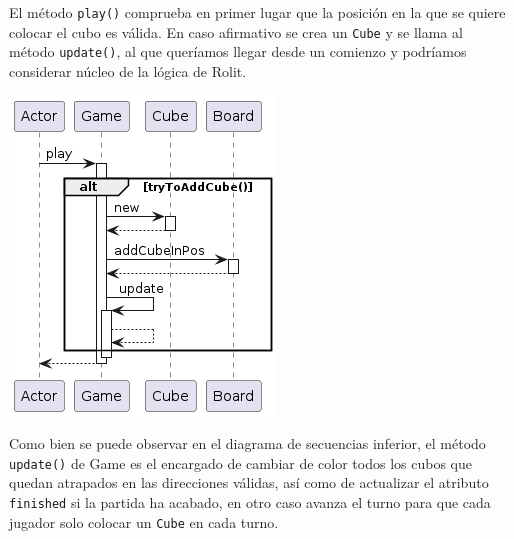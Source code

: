 \documentclass[../DocumentoOficial.tex]{subfiles}
\begin{document}
\begin{sprint}[1]
El método \texttt{play()} comprueba en primer lugar que la posición en la que se quiere colocar el cubo es válida. En caso afirmativo se crea un \texttt{Cube} y se llama al método \texttt{update()}, al que queríamos llegar desde un comienzo y podríamos considerar núcleo de la lógica de Rolit.
\begin{center}
\includegraphics[scale=0.55]{play-game.png}
\end{center}
Como bien se puede observar en el diagrama de secuencias inferior, el método
\texttt{update()} de Game  es el encargado de cambiar de color todos los cubos que quedan atrapados en las direcciones válidas, así como de actualizar el atributo \texttt{finished} si la partida ha acabado, en otro caso avanza el turno para que cada jugador solo colocar un \texttt{Cube} en cada turno.
\begin{center}

\end{center}
\end{sprint}
\end{document}
